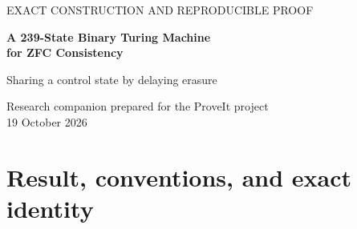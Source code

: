 \documentclass[11pt,a4paper]{article}
\begin{document}
\begin{center}
{\large\sffamily\color{teal}EXACT CONSTRUCTION AND REPRODUCIBLE PROOF}\par
\vspace{0.5em}
{\LARGE\bfseries\color{navy}A 239-State Binary Turing Machine\\[0.25em]for ZFC Consistency}\par
\vspace{0.7em}
{\large Sharing a control state by delaying erasure}\par
\vspace{0.5em}
Research companion prepared for the ProveIt project\\
19 October 2026
\end{center}

\begin{abstract}
We give a concrete one-tape, two-symbol Turing machine with 239 working
states, started on an all-zero tape, whose nonhalting is equivalent in ZFC
to the syntactic consistency of ZFC. The machine is obtained from ProveIt's
exact rotation240 construction by deleting inherited state 169 and editing
three transition rows. The useful change delays one erasure at state 91,
allowing existing paths to distinguish the two contexts now sharing state 80.

The proof has two complementary machine-level routes: six exact local
comparisons with arbitrary surrounding tape and a certified reachable-tape
guard; and a direct complete symbolic verification of all 8,386 guarded
instruction cases of the unchanged 6,455-leaf calibrated register source.
The latter uses natural-number and finite-list induction, so its scope
includes unbounded registers, padding, and spare storage. Exact blank
initialization reaches the inherited complete seed frame after 409,835
steps. The archive supplies both transition labelings, checkers, certificates,
source data, search code, and this report's LaTeX.

The new result is an ordinary mathematical proof with executable
certificates. This packet does not claim a newly compiled Lean or Rocq
theorem for the exact 239-state table, nor an internal PA endpoint.
Supplementary investigations of logical axiom compression and source
encodings are recorded with their precise limits.
\end{abstract}

\section{Result, conventions, and exact identity}
\end{document}
